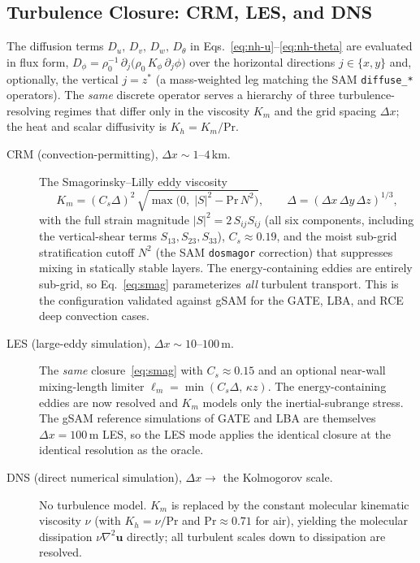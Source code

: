 \documentclass[11pt,twoside]{report}
\newcommand{\vect}[1]{\bm{#1}}
\begin{document}
\subsection{Turbulence Closure: CRM, LES, and DNS}
\label{sec:crm-les-dns}

The diffusion terms $D_u,\,D_v,\,D_w,\,D_\theta$ in
Eqs.~\eqref{eq:nh-u}--\eqref{eq:nh-theta} are evaluated in flux form,
$D_\phi = \rho_0^{-1}\,\partial_j\!\bigl(\rho_0\,K_\phi\,\partial_j\phi\bigr)$
over the horizontal directions $j\in\{x,y\}$ and, optionally, the vertical
$j=z^*$ (a mass-weighted leg matching the SAM \texttt{diffuse\_*}
operators).  The \emph{same} discrete operator serves a hierarchy of three
turbulence-resolving regimes that differ only in the viscosity $K_m$ and the
grid spacing $\Delta x$; the heat and scalar diffusivity is
$K_h = K_m/\mathrm{Pr}$.

\begin{description}
\item[CRM (convection-permitting), $\Delta x\sim 1$--$4$\,km.]
The Smagorinsky--Lilly eddy viscosity
\begin{equation}
  K_m = (C_s\Delta)^2\,
  \sqrt{\max\!\bigl(0,\;|S|^2 - \mathrm{Pr}\,N^2\bigr)},
  \qquad \Delta = (\Delta x\,\Delta y\,\Delta z)^{1/3},
  \label{eq:smag}
\end{equation}
with the full strain magnitude $|S|^2 = 2\,S_{ij}S_{ij}$ (all six
components, including the vertical-shear terms $S_{13},S_{23},S_{33}$),
$C_s\approx 0.19$, and the moist sub-grid stratification cutoff $N^2$ (the
SAM \texttt{dosmagor} correction) that suppresses mixing in statically
stable layers.  The energy-containing eddies are entirely sub-grid, so
Eq.~\eqref{eq:smag} parameterizes \emph{all} turbulent transport.  This is
the configuration validated against gSAM for the GATE, LBA, and RCE deep
convection cases.

\item[LES (large-eddy simulation), $\Delta x\sim 10$--$100$\,m.]
The \emph{same} closure~\eqref{eq:smag} with $C_s\approx 0.15$ and an
optional near-wall mixing-length limiter $\ell_m=\min(C_s\Delta,\,\kappa z)$.
The energy-containing eddies are now resolved and $K_m$ models only the
inertial-subrange stress.  The gSAM reference simulations of GATE and LBA
are themselves $\Delta x=100$\,m LES, so the LES mode applies the identical
closure at the identical resolution as the oracle.

\item[DNS (direct numerical simulation), $\Delta x\to$ the Kolmogorov scale.]
No turbulence model.  $K_m$ is replaced by the constant molecular kinematic
viscosity $\nu$ (with $K_h=\nu/\mathrm{Pr}$ and $\mathrm{Pr}\approx 0.71$ for
air), yielding the molecular dissipation $\nu\nabla^2\vect{u}$ directly; all
turbulent scales down to dissipation are resolved.
\end{description}
\end{document}
